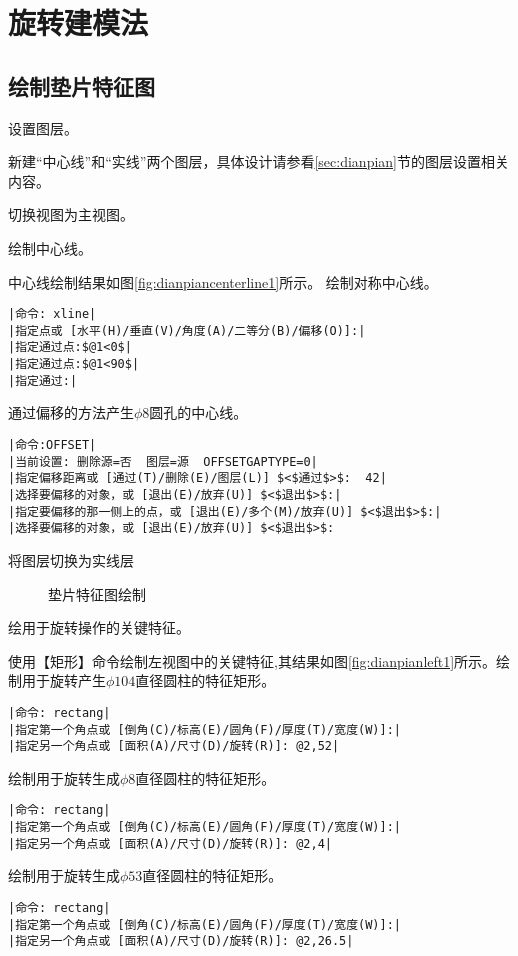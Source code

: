 \section{旋转建模法}
\subsection{绘制垫片特征图}
\begin{procedure}
\item 设置图层。

新建“中心线”和“实线”两个图层，具体设计请参看\ref{sec:dianpian}节的图层设置相关内容。
\item  切换视图为主视图。
\item 绘制中心线。

中心线绘制结果如图\ref{fig:dianpiancenterline1}所示。
绘制对称中心线。
\begin{lstlisting}
|命令: xline|
|指定点或 [水平(H)/垂直(V)/角度(A)/二等分(B)/偏移(O)]:|
|指定通过点:$@1<0$|
|指定通过点:$@1<90$|
|指定通过:|
\end{lstlisting}
通过偏移的方法产生$\phi 8$圆孔的中心线。
\begin{lstlisting}
|命令:OFFSET|
|当前设置: 删除源=否  图层=源  OFFSETGAPTYPE=0|
|指定偏移距离或 [通过(T)/删除(E)/图层(L)] $<$通过$>$:  42|
|选择要偏移的对象，或 [退出(E)/放弃(U)] $<$退出$>$:|
|指定要偏移的那一侧上的点，或 [退出(E)/多个(M)/放弃(U)] $<$退出$>$:|
|选择要偏移的对象，或 [退出(E)/放弃(U)] $<$退出$>$:
\end{lstlisting}
\item 将图层切换为实线层
\begin{figure}[htbp]
\centering
{}\hspace{40pt}
\caption{垫片特征图绘制}
\end{figure}
\item 绘用于旋转操作的关键特征。

使用【矩形】命令绘制左视图中的关键特征,其结果如图\ref{fig:dianpianleft1}所示。绘制用于旋转产生$\phi 104$直径圆柱的特征矩形。
\begin{lstlisting}
|命令: rectang|
|指定第一个角点或 [倒角(C)/标高(E)/圆角(F)/厚度(T)/宽度(W)]:|
|指定另一个角点或 [面积(A)/尺寸(D)/旋转(R)]: @2,52|
\end{lstlisting}
绘制用于旋转生成$\phi 8$直径圆柱的特征矩形。
\begin{lstlisting}
|命令: rectang|
|指定第一个角点或 [倒角(C)/标高(E)/圆角(F)/厚度(T)/宽度(W)]:|
|指定另一个角点或 [面积(A)/尺寸(D)/旋转(R)]: @2,4|
\end{lstlisting}
绘制用于旋转生成$\phi 53$直径圆柱的特征矩形。
\begin{lstlisting}
|命令: rectang|
|指定第一个角点或 [倒角(C)/标高(E)/圆角(F)/厚度(T)/宽度(W)]:|
|指定另一个角点或 [面积(A)/尺寸(D)/旋转(R)]: @2,26.5|
\end{lstlisting}
\end{procedure}

\endinput